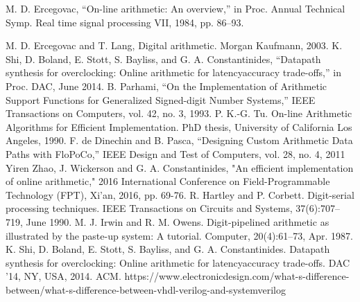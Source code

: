 \documentclass[10pt]{article}
\begin{document}
    
\begin{thebibliography}{99}

 M. D. Ercegovac, “On-line arithmetic: An overview,” in Proc. Annual
Technical Symp. Real time signal processing VII, 1984, pp. 86–93.

 M. D. Ercegovac and T. Lang, Digital arithmetic. Morgan Kaufmann,
2003.
 K. Shi, D. Boland, E. Stott, S. Bayliss, and G. A. Constantinides,
“Datapath synthesis for overclocking: Online arithmetic for latencyaccuracy trade-offs,” in Proc. DAC, June 2014.
 B. Parhami, “On the Implementation of Arithmetic Support Functions
for Generalized Signed-digit Number Systems,” IEEE Transactions on
Computers, vol. 42, no. 3, 1993.
 P. K.-G. Tu. On-line Arithmetic Algorithms for Efficient Implementation.
PhD thesis, University of California Los Angeles, 1990.
  F. de Dinechin and B. Pasca, “Designing Custom Arithmetic Data Paths
with FloPoCo,” IEEE Design and Test of Computers, vol. 28, no. 4, 2011
Yiren Zhao, J. Wickerson and G. A. Constantinides, "An efficient implementation of online arithmetic," 2016 International Conference on Field-Programmable Technology (FPT), Xi'an, 2016, pp. 69-76.
 R. Hartley and P. Corbett. Digit-serial processing techniques. IEEE
Transactions on Circuits and Systems, 37(6):707–719, June 1990.
M. J. Irwin and R. M. Owens. Digit-pipelined arithmetic as illustrated
by the paste-up system: A tutorial. Computer, 20(4):61–73, Apr. 1987.
K. Shi, D. Boland, E. Stott, S. Bayliss, and G. A. Constantinides.
Datapath synthesis for overclocking: Online arithmetic for latencyaccuracy trade-offs. DAC ’14, NY, USA, 2014. ACM.
https://www.electronicdesign.com/what-s-difference-between/what-s-difference-between-vhdl-verilog-and-systemverilog
\end{thebibliography}
\end{document}
